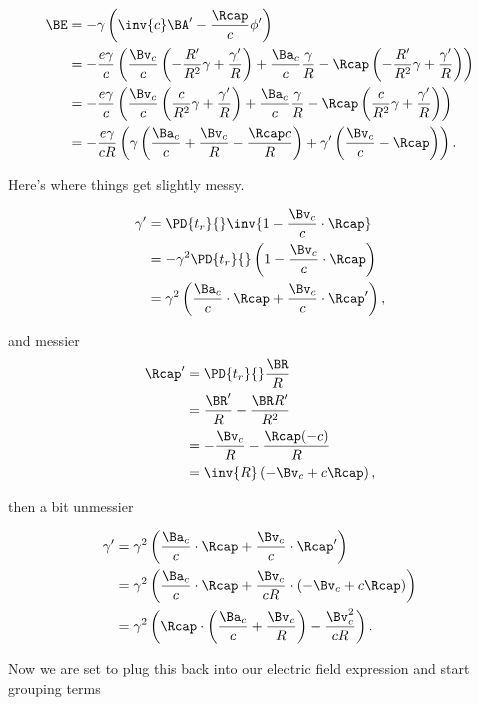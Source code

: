 \begin{align*}
\BE 
&= - \gamma \left( \inv{c} \BA' - \frac{\Rcap}{c} \phi' \right) \\
&= - \frac{e \gamma}{c} \left( 
\frac{\Bv_c}{c} \left( -\frac{R'}{R^2} \gamma + \frac{\gamma'}{R} \right)
+ \frac{\Ba_c}{c} \frac{\gamma}{R}
- \Rcap \left( -\frac{R'}{R^2} \gamma + \frac{\gamma'}{R} \right) 
\right) \\
&= - \frac{e \gamma}{c} \left( 
\frac{\Bv_c}{c} \left( \frac{c}{R^2} \gamma + \frac{\gamma'}{R} \right)
+ \frac{\Ba_c}{c} \frac{\gamma}{R}
- \Rcap \left( \frac{c}{R^2} \gamma + \frac{\gamma'}{R} \right) 
\right) \\
&= - \frac{e \gamma}{c R} \left( \gamma \left( 
\frac{\Ba_c}{c} 
+\frac{\Bv_c}{R} 
- \frac{\Rcap c}{R}
\right)
+ \gamma' \left( \frac{\Bv_c}{c} - \Rcap \right)
\right).
\end{align*}

Here's where things get slightly messy.

\begin{align*}
\gamma' 
&= \PD{t_r}{} \inv{1 - \frac{\Bv_c}{c} \cdot \Rcap } \\
&= -\gamma^2 \PD{t_r}{} \left( 1 - \frac{\Bv_c}{c} \cdot \Rcap \right) \\
&= \gamma^2 \left( \frac{\Ba_c}{c} \cdot \Rcap + \frac{\Bv_c}{c} \cdot \Rcap' \right),
\end{align*}

and messier
\begin{align*}
\Rcap' 
&= \PD{t_r}{} \frac{ \BR }{ R } \\
&= \frac{ \BR' }{ R } - \frac{\BR R'}{R^2} \\
&= -\frac{ \Bv_c }{ R } - \frac{\Rcap (-c)}{R} \\
&= \inv{R} \left( -\Bv_c + c \Rcap \right),
\end{align*}

then a bit unmessier

\begin{align*}
\gamma'
&= \gamma^2 \left( \frac{\Ba_c}{c} \cdot \Rcap + \frac{\Bv_c}{c} \cdot \Rcap' \right) \\
&= \gamma^2 \left( \frac{\Ba_c}{c} \cdot \Rcap + \frac{\Bv_c}{c R} \cdot (-\Bv_c + c \Rcap) \right) \\
&= \gamma^2 \left( \Rcap \cdot \left( \frac{\Ba_c}{c} + \frac{\Bv_c}{R} \right) - \frac{\Bv_c^2}{c R} \right).
\end{align*}

Now we are set to plug this back into our electric field expression and start grouping terms

